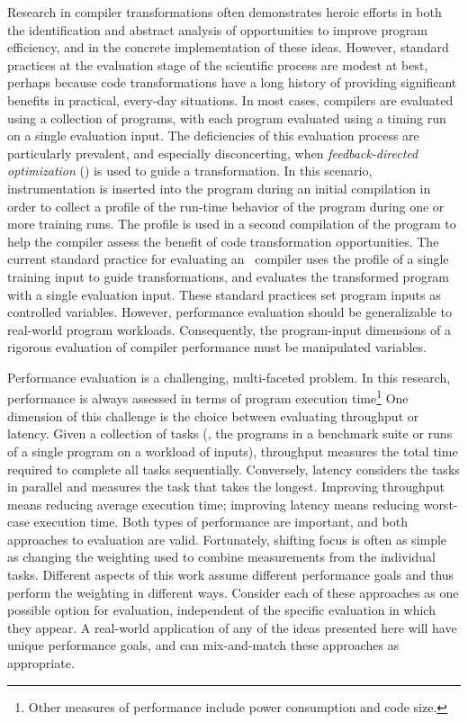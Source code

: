 Research in compiler transformations often demonstrates heroic efforts
in both the identification and abstract analysis of opportunities to
improve program efficiency, and in the concrete implementation of
these ideas.  However, standard practices at the evaluation stage of
the scientific process are modest at best, perhaps because code
transformations have a long history of providing significant benefits
in practical, every-day situations.  In most cases, compilers are
evaluated using a collection of programs, with each program evaluated
using a timing run on a single evaluation input.  The deficiencies of
this evaluation process are particularly prevalent, and especially
disconcerting, when {\it feedback-directed optimization} (\FDO) is
used to guide a transformation.  In this scenario, instrumentation is
inserted into the program during an initial compilation in order to
collect a profile of the run-time behavior of the program during one
or more training runs.  The profile is used in a second compilation of
the program to help the compiler assess the benefit of code
transformation opportunities.  The current standard practice for
evaluating an \FDO\ compiler uses the profile of a single training
input to guide transformations, and evaluates the transformed program
with a single evaluation input.  These standard practices set program
inputs as controlled variables.  However, performance evaluation
should be generalizable to real-world program workloads.
Consequently, the program-input dimensions of a rigorous evaluation of
compiler performance must be manipulated variables.

Performance evaluation is a challenging, multi-faceted problem.  In
this research, performance is always assessed in terms of program
execution time\footnote{Other measures of performance include power
consumption and code size.}  One dimension of this challenge is the
choice between evaluating throughput or latency.  Given a collection of tasks
(\eg, the programs in a benchmark suite or runs of a single program on
a workload of inputs), throughput measures the total time required to
complete all tasks sequentially.  Conversely, latency considers the
tasks in parallel and measures the task that takes the longest.
Improving throughput means reducing average execution time; improving
latency means reducing worst-case execution time.  Both types of
performance are important, and both approaches to evaluation are
valid. Fortunately, shifting focus is often as simple as changing the
weighting used to combine measurements from the individual tasks.
Different aspects of this work assume different performance goals and
thus perform the weighting in different ways.  Consider each of these
approaches as one possible option for evaluation, independent of the
specific evaluation in which they appear.  A real-world application of
any of the ideas presented here will have unique performance goals,
and can mix-and-match these approaches as appropriate.

